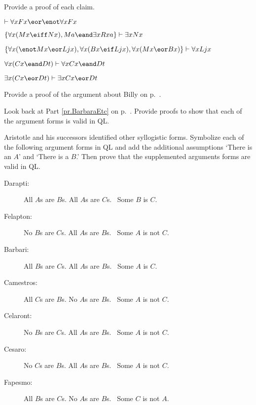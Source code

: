 \solutions
\problempart
\label{pr.someQLproofs}
Provide a proof of each claim.
\begin{earg}
\item $\vdash \forall x Fx \eor \enot \forall x Fx$
\item $\{\forall x(Mx \eiff Nx), Ma\eand\exists x Rxa\}\vdash \exists x Nx$
\item $\{\forall x(\enot Mx \eor Ljx), \forall x(Bx\eif Ljx), \forall x(Mx\eor Bx)\}\vdash \forall xLjx$
\item $\forall x(Cx \eand Dt)\vdash \forall xCx \eand Dt$
\item $\exists x(Cx \eor Dt)\vdash \exists x Cx \eor Dt$
\end{earg}

\problempart
Provide a proof of the argument about Billy on p.~\pageref{surgeon2}.




\problempart
\label{pr.BarbaraEtc.proof1}
Look back at Part \ref{pr.BarbaraEtc} on p.~\pageref{pr.BarbaraEtc}. Provide proofs to show that each of the argument forms is valid in QL.



\problempart
\label{pr.BarbaraEtc.proof2}
Aristotle and his successors identified other syllogistic forms. Symbolize each of the following argument forms in QL and add the additional assumptions `There is an $A$' and `There is a $B$.' Then prove that the supplemented arguments forms are valid in QL.

\begin{description}
\item[Darapti:] All $A$s are $B$s. All $A$s are $C$s.
	\therefore\  Some $B$ is $C$.
\item[Felapton:] No $B$s are $C$s. All $A$s are $B$s.
	\therefore\  Some $A$ is not $C$.
\item[Barbari:] All $B$s are $C$s. All $A$s are $B$s.
	\therefore\  Some $A$ is $C$.
\item[Camestros:] All $C$s are $B$s. No $A$s are $B$s.
	\therefore\  Some $A$ is not $C$.
\item[Celaront:] No $B$s are $C$s. All $A$s are $B$s.
	\therefore\  Some $A$ is not $C$.
\item[Cesaro:] No $C$s are $B$s. All $A$s are $B$s.
	\therefore\  Some $A$ is not $C$.
\item[Fapesmo:] All $B$s are $C$s. No $A$s are $B$s.
	\therefore\  Some $C$ is not $A$.
\end{description}



